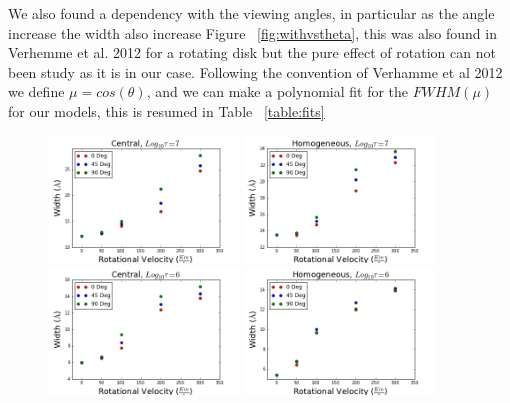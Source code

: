 \documentclass[usenatbib]{mn2e}
\begin{document}
We also found a dependency with the viewing angles, in particular as the angle increase the width also increase Figure ~\ref{fig:withvstheta}, this was also found in Verhemme et al. 2012 for a rotating disk but the pure effect of rotation can not been study as it is in our case. Following the convention of Verhamme et al 2012 we define $\mu=cos(\theta)$, and we can make a polynomial fit for the $FWHM(\mu)$ for our models, this is resumed in Table ~\ref{table:fits}


\begin{figure}
    \includegraphics[width=0.45\textwidth]{Width7Central.png}
    \includegraphics[width=0.45\textwidth]{Width7Homogeneous.png}
    \includegraphics[width=0.45\textwidth]{Width6.png}
    \includegraphics[width=0.45\textwidth]{Width6HOM.png}

\end{figure}
\end{document}
